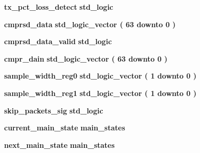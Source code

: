 \begin{DoxyCompactItemize}
\item 
{\bf tx\+\_\+pct\+\_\+loss\+\_\+detect} {\bfseries \textcolor{comment}{std\+\_\+logic}\textcolor{vhdlchar}{ }} 
\item 
{\bf cmprsd\+\_\+data} {\bfseries \textcolor{comment}{std\+\_\+logic\+\_\+vector}\textcolor{vhdlchar}{ }\textcolor{vhdlchar}{(}\textcolor{vhdlchar}{ }\textcolor{vhdlchar}{ } \textcolor{vhdldigit}{63} \textcolor{vhdlchar}{ }\textcolor{keywordflow}{downto}\textcolor{vhdlchar}{ }\textcolor{vhdlchar}{ } \textcolor{vhdldigit}{0} \textcolor{vhdlchar}{ }\textcolor{vhdlchar}{)}\textcolor{vhdlchar}{ }} 
\item 
{\bf cmprsd\+\_\+data\+\_\+valid} {\bfseries \textcolor{comment}{std\+\_\+logic}\textcolor{vhdlchar}{ }} 
\item 
{\bf cmpr\+\_\+dain} {\bfseries \textcolor{comment}{std\+\_\+logic\+\_\+vector}\textcolor{vhdlchar}{ }\textcolor{vhdlchar}{(}\textcolor{vhdlchar}{ }\textcolor{vhdlchar}{ } \textcolor{vhdldigit}{63} \textcolor{vhdlchar}{ }\textcolor{keywordflow}{downto}\textcolor{vhdlchar}{ }\textcolor{vhdlchar}{ } \textcolor{vhdldigit}{0} \textcolor{vhdlchar}{ }\textcolor{vhdlchar}{)}\textcolor{vhdlchar}{ }} 
\item 
{\bf sample\+\_\+width\+\_\+reg0} {\bfseries \textcolor{comment}{std\+\_\+logic\+\_\+vector}\textcolor{vhdlchar}{ }\textcolor{vhdlchar}{(}\textcolor{vhdlchar}{ }\textcolor{vhdlchar}{ } \textcolor{vhdldigit}{1} \textcolor{vhdlchar}{ }\textcolor{keywordflow}{downto}\textcolor{vhdlchar}{ }\textcolor{vhdlchar}{ } \textcolor{vhdldigit}{0} \textcolor{vhdlchar}{ }\textcolor{vhdlchar}{)}\textcolor{vhdlchar}{ }} 
\item 
{\bf sample\+\_\+width\+\_\+reg1} {\bfseries \textcolor{comment}{std\+\_\+logic\+\_\+vector}\textcolor{vhdlchar}{ }\textcolor{vhdlchar}{(}\textcolor{vhdlchar}{ }\textcolor{vhdlchar}{ } \textcolor{vhdldigit}{1} \textcolor{vhdlchar}{ }\textcolor{keywordflow}{downto}\textcolor{vhdlchar}{ }\textcolor{vhdlchar}{ } \textcolor{vhdldigit}{0} \textcolor{vhdlchar}{ }\textcolor{vhdlchar}{)}\textcolor{vhdlchar}{ }} 
\item 
{\bf skip\+\_\+packets\+\_\+sig} {\bfseries \textcolor{comment}{std\+\_\+logic}\textcolor{vhdlchar}{ }} 
\item 
{\bf current\+\_\+main\+\_\+state} {\bfseries {\bfseries {\bf main\+\_\+states}} \textcolor{vhdlchar}{ }} 
\item 
{\bf next\+\_\+main\+\_\+state} {\bfseries {\bfseries {\bf main\+\_\+states}} \textcolor{vhdlchar}{ }} 
\item 

\end{DoxyCompactItemize}
